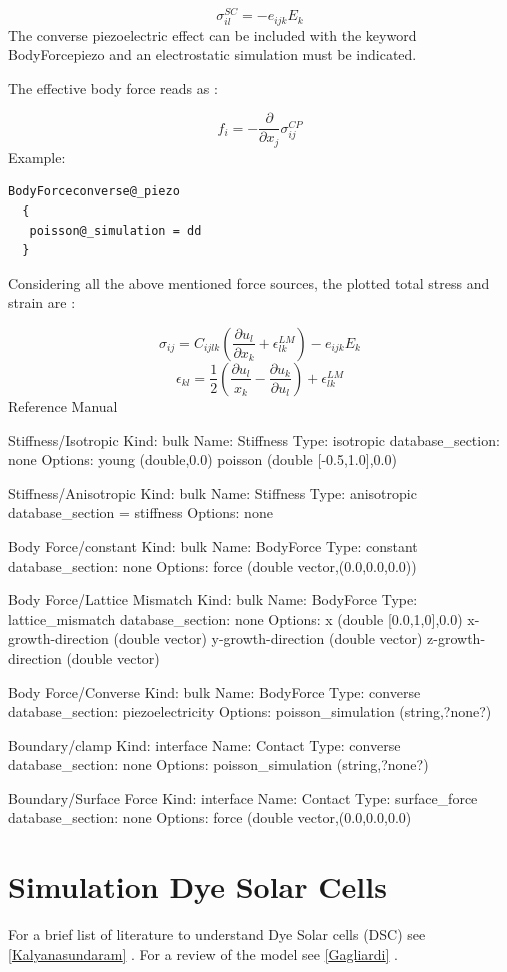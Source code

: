 \documentclass[letterpaper,10pt,english]{sphinxmanual}
\begin{document}
 \[
 \sigma_{il}^{SC}=-e_{ijk}E_k
 \]
The converse piezoelectric effect can be included with the keyword BodyForcepiezo and an electrostatic simulation must be indicated.


The effective body force reads as :

 \[
 f_i = -\frac{\partial}{\partial x_j} \sigma_{ij}^{CP}
 \]
Example:


\begin{Verbatim}[commandchars=@\[\]]
BodyForceconverse@_piezo
  {
   poisson@_simulation = dd
  }
\end{Verbatim}

Considering all the above mentioned force sources, the plotted total stress and strain are :

 \[
 \sigma_{ij} = C_{ijlk}\left( \frac{\partial u_l}{\partial x_k} + \epsilon_{lk}^{LM} \right) -e_{ijk}E_k
 \] \[
 \epsilon_{kl}=\frac{1}{2}\left(\frac{\partial u_l}{x_k}-\frac{\partial u_k}{\partial u_l} \right ) + \epsilon_{lk}^{LM}
 \]
Reference Manual


Stiffness/Isotropic
Kind: bulk
Name: Stiffness
Type: isotropic
database\_section: none
Options:
young  (double,0.0)
poisson (double {[}-0.5,1.0{]},0.0)


Stiffness/Anisotropic
Kind: bulk
Name: Stiffness
Type: anisotropic
database\_section = stiffness
Options:
none


Body Force/constant
Kind: bulk
Name: BodyForce
Type: constant
database\_section: none
Options:
force (double vector,(0.0,0.0,0.0))


Body Force/Lattice Mismatch
Kind: bulk
Name: BodyForce
Type: lattice\_mismatch
database\_section: none
Options:
x (double {[}0.0,1,0{]},0.0)
x-growth-direction (double vector)
y-growth-direction (double vector)
z-growth-direction (double vector)


Body Force/Converse
Kind: bulk
Name: BodyForce
Type: converse
database\_section: piezoelectricity
Options:
poisson\_simulation (string,?none?)


Boundary/clamp
Kind: interface
Name: Contact
Type: converse
database\_section: none
Options:
poisson\_simulation (string,?none?)


Boundary/Surface Force
Kind: interface
Name: Contact
Type: surface\_force
database\_section: none
Options:
force (double vector,(0.0,0.0,0.0)



\chapter{Simulation Dye Solar Cells}
\label{Dsc:simulation-dye-solar-cells}\label{Dsc::doc}\label{Dsc:dsc}
For a brief list of literature to understand Dye Solar cells (DSC) see {\hyperref[Bibliography:kalyanasundaram]{{[}Kalyanasundaram{]}}} . For a review
of the model see {\hyperref[Bibliography:gagliardi]{{[}Gagliardi{]}}} .
\end{document}
